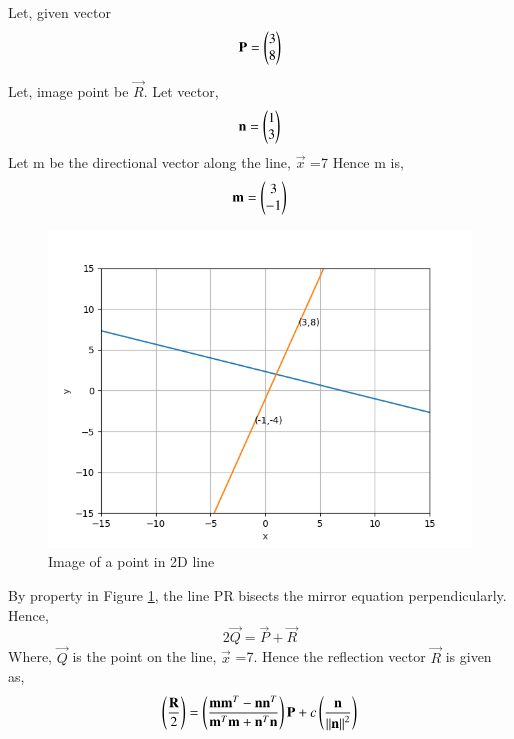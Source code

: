 Let, given vector
 \begin{equation}
  \mathbf{P} = \begin{pmatrix}3 \\ 8\end{pmatrix}
 \end{equation}

    
Let, image point be $\vec{R} $. 
Let vector,
\begin{equation}
 \mathbf{n}  = \begin{pmatrix}1 \\ 3\end{pmatrix}
\end{equation}
Let m be the directional vector along the line,  
 $\vec{x}$ =7   
Hence m is,
\begin{equation}
\mathbf{m} = \begin{pmatrix}3 \\ -1\end{pmatrix} 
\end{equation}
 


\begin{figure}[!ht]
\centering

\includegraphics[width=\columnwidth]{./solutions/line_plane/55/Figure_1.png}
\caption{Image of a point in 2D line}
\label{fig1:solutions/line_plane/55/}
\end{figure}
By property in Figure \ref{fig1:solutions/line_plane/55/}, the line PR bisects the mirror equation perpendicularly. Hence, 
\begin{equation}
    2\vec{Q} = \vec{P} + \vec{R}
\end{equation}
Where, $\vec{Q}$ is the point on the line,   $\vec{x}$ =7.
Hence the reflection vector $\vec{R}$ is given as, 
\begin{equation}
    \left( \frac{\mathbf{R}}{2}\right) = \left(\frac{\mathbf{m}\mathbf{m}^T - \mathbf{n}\mathbf{n}^T}{\mathbf{m}^T\mathbf{m} + \mathbf{n}^T  \mathbf{n}}\right)\mathbf{P} + c \left(\frac{\mathbf{n}}{\left\lVert\mathbf{n}\right\rVert^2}\right)    \label{eq::solutions/line_plane/55/2}
\end{equation}




